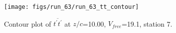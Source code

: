 \begin{figure}[H]
\centering
\texttt{[image: figs/run\_63/run\_63\_tt\_contour]}
\caption{Contour plot of $\overline{t^\prime t^\prime}$ at $z/c$=10.00, $V_{free}$=19.1, station 7.}
\label{fig:run_63_tt_contour}
\end{figure}



